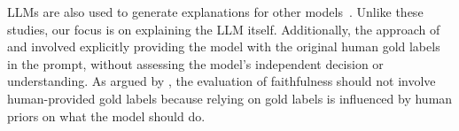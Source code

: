 LLMs are also used to generate explanations for other  models~\cite{bhattacharjee2024towards,slack2023explaining,nguyen2024llms,li2023prompting,gat2023faithful}. Unlike these studies, our focus is on explaining the LLM itself.
Additionally, the approach of \citet{nguyen2024llms} and \citet{li2023prompting} involved explicitly providing the model with the original human gold labels in the prompt, without assessing the model's independent decision or understanding. As argued by \citet{jacovi2020towards}, the evaluation of faithfulness should not involve human-provided gold labels because relying on gold labels is influenced by human priors on what the model should do.